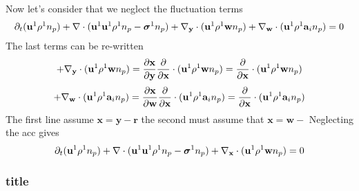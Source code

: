 Now let's consider that we neglect the fluctuation terms
\begin{align*}
    \partial_t (\textbf{u}^1 \rho^1n_p) + \mathbf{\nabla}\cdot(\textbf{u}^1 \textbf{u}^1 \rho^1 n_p - \bm\sigma^1n_p) 
    +{\mathbf{\nabla}_\textbf{y}}\cdot (\textbf{u}^1 \rho^1  \textbf{w}n_p)
    +{\mathbf{\nabla}_\textbf{w}}\cdot (\textbf{u}^1 \rho^1  \textbf{a}_in_p) = 0 \\
\end{align*}
The last terms can be re-written 
\begin{equation*}
    +{\mathbf{\nabla}_\textbf{y}}\cdot (\textbf{u}^1 \rho^1  \textbf{w}n_p)
    = 
    \frac{\partial \textbf{x}}{\partial \textbf{y}}
    \frac{\partial }{\partial \textbf{x}}
    \cdot (\textbf{u}^1 \rho^1  \textbf{w}n_p)
    = 
    \frac{\partial }{\partial \textbf{x}}
    \cdot (\textbf{u}^1 \rho^1  \textbf{w}n_p)
\end{equation*}
\begin{equation*}
    +{\mathbf{\nabla}_\textbf{w}}\cdot (\textbf{u}^1 \rho^1  \textbf{a}_i n_p)
    = 
    \frac{\partial \textbf{x}}{\partial \textbf{w}}
    \frac{\partial }{\partial \textbf{x}}
    \cdot (\textbf{u}^1 \rho^1  \textbf{a}_i n_p)
    = 
    \frac{\partial }{\partial \textbf{x}}
    \cdot (\textbf{u}^1 \rho^1  \textbf{a}_i n_p)
\end{equation*}
The first line assume $\textbf{x} = \textbf{y}- \textbf{r}$ the second must assume that $\textbf{x} = \textbf{w}-$
Neglecting the acc gives 
\begin{align*}
    \partial_t (\textbf{u}^1 \rho^1n_p) + \mathbf{\nabla}\cdot(\textbf{u}^1 \textbf{u}^1 \rho^1 n_p - \bm\sigma^1n_p) 
    +{\mathbf{\nabla}_\textbf{x}}\cdot (\textbf{u}^1 \rho^1  \textbf{w}n_p)
    = 0 \\
\end{align*}
\subsubsection*{title}
